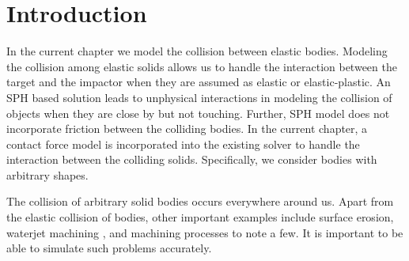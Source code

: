 \chapter{Introduction}
\label{chap:intro}


In the current chapter we model the collision between elastic bodies. Modeling
the collision among elastic solids allows us to handle the interaction between
the target and the impactor when they are assumed as elastic or elastic-plastic.
An SPH based solution leads to unphysical interactions in modeling the collision
of objects when they are close by but not touching. Further, SPH model does not
incorporate friction between the colliding bodies. In the current chapter, a
contact force model is incorporated into the existing solver to handle the
interaction between the colliding solids. Specifically, we consider bodies with
arbitrary shapes.


The collision of arbitrary solid bodies occurs everywhere around us. Apart
from the elastic collision of bodies, other important examples include surface
erosion, waterjet machining \citep{natarajan2020abrasive}, and machining
processes \citep{islam2020numerical} to note a few. It is important to be able
to simulate such problems accurately.



